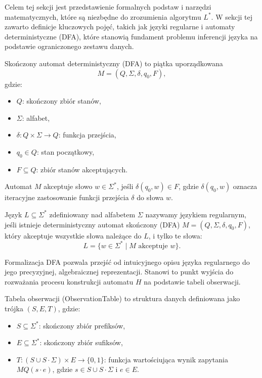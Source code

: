 Celem tej sekcji jest przedstawienie formalnych podstaw i narzędzi matematycznych, które są niezbędne do zrozumienia algorytmu \( L^* \). W sekcji tej zawarto definicje kluczowych pojęć, takich jak języki regularne i automaty deterministyczne (DFA), które stanowią fundament problemu inferencji języka na podstawie ograniczonego zestawu danych.

\begin{definition}[DFA]
    \label{def:dfa}
    Skończony automat deterministyczny (DFA) to piątka uporządkowana
    \[ 
    M = (Q, \Sigma, \delta, q_0, F), 
    \]
    gdzie:
    \begin{itemize}
        \item \( Q \): skończony zbiór stanów,
        \item \( \Sigma \): alfabet,
        \item \( \delta: Q \times \Sigma \to Q \): funkcja przejścia,
        \item \( q_0 \in Q \): stan początkowy,
        \item \( F \subseteq Q \): zbiór stanów akceptujących.
    \end{itemize}
\end{definition}

\begin{definition}
    \label{def:word_acceptance}
    Automat \( M \) akceptuje słowo \( w \in \Sigma^* \), jeśli \( \delta(q_0, w) \in F \), gdzie \( \delta(q_0, w) \) oznacza iteracyjne zastosowanie funkcji przejścia \( \delta \) do słowa \( w \).
\end{definition}

\begin{definition}  
    \label{def:regular_language}
    Język \( L \subseteq \Sigma^* \) zdefiniowany nad alfabetem \( \Sigma \) nazywamy językiem regularnym, jeśli istnieje deterministyczny automat skończony (DFA) \( M = (Q, \Sigma, \delta, q_0, F) \), który akceptuje wszystkie słowa należące do \( L \), i tylko te słowa:
    \[
    L = \{ w \in \Sigma^* \mid M \text{ akceptuje } w \}.
    \]
\end{definition}

Formalizacja DFA pozwala przejść od intuicyjnego opisu języka regularnego do jego precyzyjnej, algebraicznej reprezentacji. Stanowi to punkt wyjścia do rozważania procesu konstrukcji automatu \( H \) na podstawie tabeli obserwacji.

\begin{definition} 
    Tabela obserwacji (ObservationTable) to struktura danych definiowana jako trójka \( (S, E, T) \), gdzie:
    \begin{itemize}
        \item \( S \subseteq \Sigma^* \): skończony zbiór prefiksów,
         \item \( E \subseteq \Sigma^* \): skończony zbiór sufiksów,
        \item \( T: (S \cup S \cdot \Sigma) \times E \to \{0, 1\} \): funkcja wartościująca wynik zapytania \( MQ(s \cdot e) \), gdzie \( s \in S \cup S \cdot \Sigma \) i \( e \in E \).
    \end{itemize}
\end{definition}

